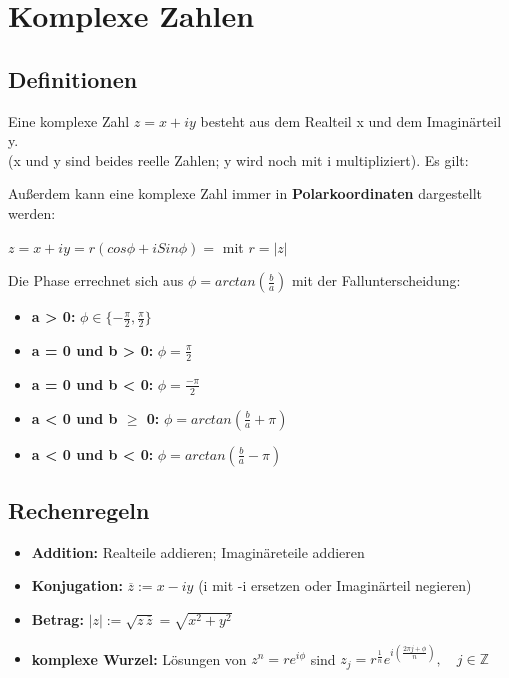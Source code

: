 \documentclass[a4paper,12pt]{article} %
\begin{document}


\section{Komplexe Zahlen}
\subsection{Definitionen}
Eine komplexe Zahl $z=x+iy$ besteht aus dem Realteil x und dem Imaginärteil y.\\
(x und y sind beides reelle Zahlen; y wird noch mit i multipliziert). Es gilt:
\begin{center}
\end{center}
Außerdem kann eine komplexe Zahl immer in \textbf{Polarkoordinaten} dargestellt werden:
\begin{center}
$z = x+iy = r(cos\phi + i Sin \phi) = $  mit $r = |z|$
\end{center}
Die Phase errechnet sich aus $\phi = arctan(\frac{b}{a})$ mit der Fallunterscheidung:
\begin{itemize}
\item \textbf{a > 0:} $\phi \in \{-\frac{\pi}{2},\frac{\pi}{2}\}$
\item \textbf{a = 0 und b > 0:} $\phi = \frac{\pi}{2}$
\item \textbf{a = 0 und b < 0:} $\phi = \frac{-\pi}{2}$
\item \textbf{a < 0 und b $\geq$ 0:} $\phi = arctan(\frac{b}{a}+\pi)$
\item \textbf{a < 0 und b < 0:} $\phi = arctan(\frac{b}{a}-\pi)$

\end{itemize}
\subsection{Rechenregeln}
\begin{itemize}
\item \textbf{Addition:} Realteile addieren; Imaginäreteile addieren
\item \textbf{Konjugation:} $\overline{z}:=x-iy$ (i mit -i ersetzen oder Imaginärteil negieren)
\item \textbf{Betrag:} $|z| := \sqrt{z \, \overline{z}} = \sqrt{x^2+y^2}$
\item \textbf{komplexe Wurzel:} Lösungen von $z^n = r e^{i\phi} $ sind $z_{j} = r^\frac{1}{n} e^{i (\frac{2 \pi j+ \phi}{n})}, \quad j \in \mathbb{Z} $
\end{itemize}
\end{document}
